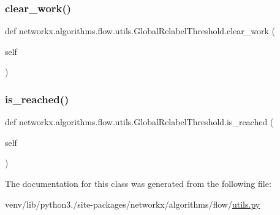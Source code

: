 \subsubsection{\texorpdfstring{clear\+\_\+work()}{clear\_work()}}
{\footnotesize\ttfamily def networkx.\+algorithms.\+flow.\+utils.\+Global\+Relabel\+Threshold.\+clear\+\_\+work (\begin{DoxyParamCaption}\item[{}]{self }\end{DoxyParamCaption})}

\mbox{\label{classnetworkx_1_1algorithms_1_1flow_1_1utils_1_1GlobalRelabelThreshold_aea1ab5f0837863b907d0a4a5cd24c78b}} 
\subsubsection{\texorpdfstring{is\+\_\+reached()}{is\_reached()}}
{\footnotesize\ttfamily def networkx.\+algorithms.\+flow.\+utils.\+Global\+Relabel\+Threshold.\+is\+\_\+reached (\begin{DoxyParamCaption}\item[{}]{self }\end{DoxyParamCaption})}



The documentation for this class was generated from the following file\+:\begin{DoxyCompactItemize}
\item 
venv/lib/python3./site-\/packages/networkx/algorithms/flow/\hyperlink{networkx_2algorithms_2flow_2utils_8py}{utils.\+py}\end{DoxyCompactItemize}
